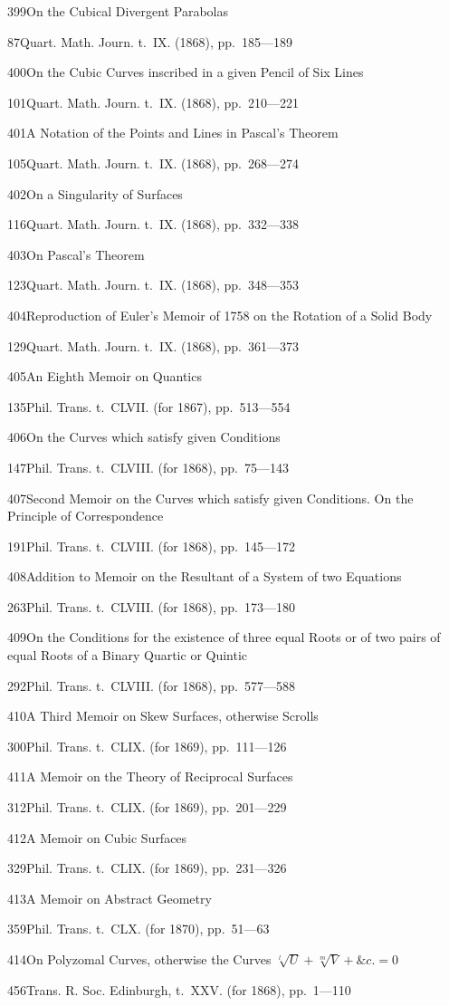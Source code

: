 \documentclass[11pt,a4paper]{book}
\providecommand{\tocentry}[2]{#1\dotfill #2\par}
\begin{document}
\tocentry{399}{On the Cubical Divergent Parabolas}{87}{Quart. Math. Journ. t.~IX. (1868), pp.~185---189}

\tocentry{400}{On the Cubic Curves inscribed in a given Pencil of Six Lines}{101}{Quart. Math. Journ. t.~IX. (1868), pp.~210---221}

\tocentry{401}{A Notation of the Points and Lines in Pascal's Theorem}{105}{Quart. Math. Journ. t.~IX. (1868), pp.~268---274}

\tocentry{402}{On a Singularity of Surfaces}{116}{Quart. Math. Journ. t.~IX. (1868), pp.~332---338}

\tocentry{403}{On Pascal's Theorem}{123}{Quart. Math. Journ. t.~IX. (1868), pp.~348---353}

\tocentry{404}{Reproduction of Euler's Memoir of 1758 on the Rotation of a Solid Body}{129}{Quart. Math. Journ. t.~IX. (1868), pp.~361---373}

\tocentry{405}{An Eighth Memoir on Quantics}{135}{Phil. Trans. t.~CLVII. (for 1867), pp.~513---554}

\tocentry{406}{On the Curves which satisfy given Conditions}{147}{Phil. Trans. t.~CLVIII. (for 1868), pp.~75---143}

\tocentry{407}{Second Memoir on the Curves which satisfy given Conditions. On the Principle of Correspondence}{191}{Phil. Trans. t.~CLVIII. (for 1868), pp.~145---172}

\tocentry{408}{Addition to Memoir on the Resultant of a System of two Equations}{263}{Phil. Trans. t.~CLVIII. (for 1868), pp.~173---180}

\tocentry{409}{On the Conditions for the existence of three equal Roots or of two pairs of equal Roots of a Binary Quartic or Quintic}{292}{Phil. Trans. t.~CLVIII. (for 1868), pp.~577---588}

\newpage

\tocentry{410}{A Third Memoir on Skew Surfaces, otherwise Scrolls}{300}{Phil. Trans. t.~CLIX. (for 1869), pp.~111---126}

\tocentry{411}{A Memoir on the Theory of Reciprocal Surfaces}{312}{Phil. Trans. t.~CLIX. (for 1869), pp.~201---229}

\tocentry{412}{A Memoir on Cubic Surfaces}{329}{Phil. Trans. t.~CLIX. (for 1869), pp.~231---326}

\tocentry{413}{A Memoir on Abstract Geometry}{359}{Phil. Trans. t.~CLX. (for 1870), pp.~51---63}

\tocentry{414}{On Polyzomal Curves, otherwise the Curves $\sqrt[l]{U} + \sqrt[m]{V} + \&c. = 0$}{456}{Trans. R. Soc. Edinburgh, t.~XXV. (for 1868), pp.~1---110}
\end{document}
